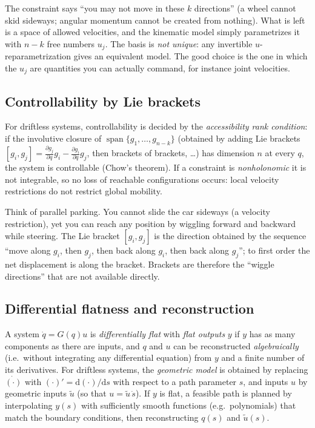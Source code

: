 \documentclass[11pt,a4paper]{article}
\def\boldsymbol#1{#1}%
\newcommand{\q}{\boldsymbol{q}}
\newcommand{\g}{\boldsymbol{g}}
\theoremstyle{definition}
\theoremstyle{plain}
\theoremstyle{remark}
\begin{document}
\begin{intuition}
The constraint says ``you may not move in these $k$ directions'' (a wheel cannot skid sideways; angular momentum cannot be created from nothing). What is left is a space of allowed velocities, and the kinematic model simply parametrizes it with $n-k$ free numbers $u_j$.
The basis is \emph{not unique}: any invertible $u$-reparametrization gives an equivalent model. The good choice is the one in which the $u_j$ are quantities you can actually command, for instance joint velocities.
\end{intuition}

\subsection{Controllability by Lie brackets}

For driftless systems, controllability is decided by the \emph{accessibility rank condition}: if the involutive closure of $\operatorname{span}\{\g_1,\dots,\g_{n-k}\}$ (obtained by adding Lie brackets $[\g_i,\g_j]=\frac{\partial \g_j}{\partial \q}\g_i-\frac{\partial \g_i}{\partial \q}\g_j$, then brackets of brackets, \dots) has dimension $n$ at every $\q$, the system is controllable (Chow's theorem). If a constraint is \emph{nonholonomic} it is not integrable, so no loss of reachable configurations occurs: local velocity restrictions do not restrict global mobility.

\begin{intuition}
Think of parallel parking. You cannot slide the car sideways (a velocity restriction), yet you can reach any position by wiggling forward and backward while steering. The Lie bracket $[\g_i,\g_j]$ is the direction obtained by the sequence ``move along $\g_i$, then $\g_j$, then back along $\g_i$, then back along $\g_j$''; to first order the net displacement is along the bracket. Brackets are therefore the ``wiggle directions'' that are not available directly.
\end{intuition}

\subsection{Differential flatness and reconstruction}

A system $\dot\q=G(\q)u$ is \emph{differentially flat} with \emph{flat outputs} $y$ if $y$ has as many components as there are inputs, and $\q$ and $u$ can be reconstructed \emph{algebraically} (i.e.\ without integrating any differential equation) from $y$ and a finite number of its derivatives. For driftless systems, the \emph{geometric model} is obtained by replacing $\dot{(\cdot)}$ with $(\cdot)'=\mathrm d(\cdot)/\mathrm ds$ with respect to a path parameter $s$, and inputs $u$ by geometric inputs $\tilde u$ (so that $u=\tilde u\,\dot s$).
If $y$ is flat, a feasible path is planned by interpolating $y(s)$ with sufficiently smooth functions (e.g.\ polynomials) that match the boundary conditions, then reconstructing $\q(s)$ and $\tilde u(s)$.
\end{document}
